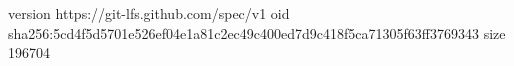 version https://git-lfs.github.com/spec/v1
oid sha256:5cd4f5d5701e526ef04e1a81c2ec49c400ed7d9c418f5ca71305f63ff3769343
size 196704
